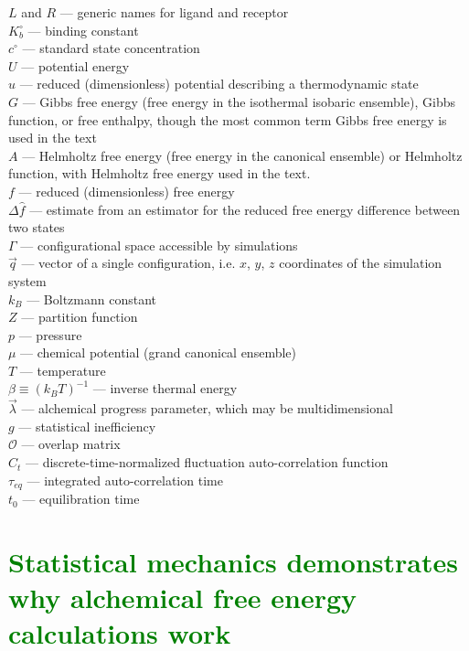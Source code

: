 \documentclass[9pt,bestpractices,pubversion]{livecoms}
\newcommand{\tocgreen}[1]{\textcolor{green}{#1}}
\newcommand{\tocorange}[1]{\textcolor{orange}{#1}}
\begin{document}
\begin{tcolorbox}[title=List of Symbols, colback=green!10!white]
$L$ and $R$ --- generic names for ligand and receptor\\
$K_b^{\circ}$ --- binding  constant \\
$c^{\circ}$ --- standard state concentration \\
$U$ --- potential energy\\
$u$ --- reduced (dimensionless) potential describing a thermodynamic state \\
$G$ --- Gibbs free energy (free energy in the isothermal isobaric ensemble), Gibbs function, or free enthalpy, though the most common term Gibbs free energy is used in the text\\
$A$ --- Helmholtz free energy (free energy in the canonical ensemble) or Helmholtz function, with Helmholtz free energy used in the text.\\
$f$ --- reduced (dimensionless) free energy \\
$\Delta \hat{f}$ --- estimate from an estimator for the reduced free energy difference between two states\\
$\Gamma$ --- configurational space accessible by simulations \\
$\vec{q}$ --- vector of a single configuration, i.e. $x$, $y$, $z$ coordinates of the simulation system\\
$k_B$ --- Boltzmann constant \\
$Z$ --- partition function \\
$p$ --- pressure \\
$\mu$ --- chemical potential (grand canonical ensemble)\\
$T$ --- temperature \\
$\beta \equiv (k_B T)^{-1}$ --- inverse thermal energy \\
$\vec{\lambda}$ --- alchemical progress parameter, which may be multidimensional \\
$g$ --- statistical inefficiency\\
$\mathcal{O}$ --- overlap matrix\\
$C_t$ --- discrete-time-normalized fluctuation auto-correlation function\\
$\tau _{eq}$ --- integrated auto-correlation time\\
$t_0$ --- equilibration time
\end{tcolorbox}

\section{\tocgreen{Statistical mechanics demonstrates why alchemical free energy calculations work}}
\label{sec:theory}
\end{document}
